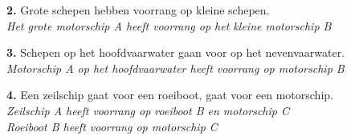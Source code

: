 \vspace{-0.7cm}

\begin{figure}[H]
	\centering
	\begin{minipage}[t]{0.70\textwidth}
		\textbf{2.} Grote schepen hebben voorrang op kleine schepen.\\
		\textit{Het grote motorschip A heeft voorrang op het kleine motorschip B}
	\end{minipage}
	\hfill
	\begin{minipage}[t]{0.20\textwidth}
		\label{pic:kr2}
	\end{minipage}
	\hfill
\end{figure}

\vspace{-0.7cm}
\begin{figure}[H]
	\centering
	\begin{minipage}[t]{0.72\textwidth}
		\textbf{3.} Schepen op het hoofdvaarwater gaan voor op het nevenvaarwater.\\
		\textit{Motorschip A op het hoofdvaarwater heeft voorrang op motorschip B}
	\end{minipage}
	\hfill
	\begin{minipage}[t]{0.20\textwidth}
		\label{pic:kr3}
	\end{minipage}
	\hfill
\end{figure}

\vspace{-0.7cm}
\begin{figure}[H]
	\centering
	\begin{minipage}[t]{0.70\textwidth}
		\textbf{4.} Een zeilschip gaat voor een roeiboot, gaat voor een motorschip.\\
		\textit{Zeilschip A heeft voorrang op roeiboot B en motorschip C\\
			Roeiboot B heeft voorrang op motorschip C}
	\end{minipage}
	\hfill
	\begin{minipage}[t]{0.20\textwidth}
		\label{pic:kr4}
	\end{minipage}
	\hfill
\end{figure}


